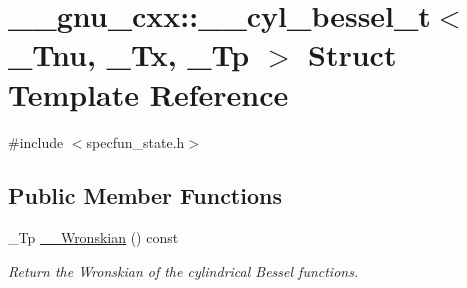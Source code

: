 \hypertarget{struct____gnu__cxx_1_1____cyl__bessel__t}{}\section{\+\_\+\+\_\+gnu\+\_\+cxx\+:\+:\+\_\+\+\_\+cyl\+\_\+bessel\+\_\+t$<$ \+\_\+\+Tnu, \+\_\+\+Tx, \+\_\+\+Tp $>$ Struct Template Reference}
\label{struct____gnu__cxx_1_1____cyl__bessel__t}


{\ttfamily \#include $<$specfun\+\_\+state.\+h$>$}

\subsection*{Public Member Functions}
\begin{DoxyCompactItemize}
\item 
\+\_\+\+Tp \hyperlink{struct____gnu__cxx_1_1____cyl__bessel__t_ada495ea77164f6b5e624bb0903506003}{\+\_\+\+\_\+\+Wronskian} () const 
\begin{DoxyCompactList}\small\item\em Return the Wronskian of the cylindrical Bessel functions. \end{DoxyCompactList}\end{DoxyCompactItemize}
